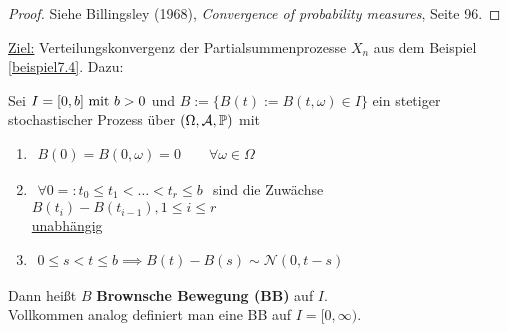 \begin{proof}
Siehe Billingsley (1968), \textit{Convergence of probability measures}, Seite 96.
\end{proof}

\ul{Ziel:} Verteilungskonvergenz der Partialsummenprozesse $X_n$ aus dem Beispiel \ref{beispiel7.4}. Dazu:

\begin{definition}\label{def7.12} %
Sei $I=[0,b]\mit b>0$ und $B:=\big\lbrace B(t):=B(t,\omega)\in I\big\rbrace$ ein stetiger stochastischer Prozess über $(\Omega,\A,\P)$ mit 
\begin{enumerate}[label=(\arabic*)]
\item $\begin{aligned}
B(0)=B(0,\omega)=0\qquad\forall\omega\in\Omega
\end{aligned}$
\item $\begin{aligned}
\forall 0=:t_0\leq t_1<\ldots<t_r\leq b
\end{aligned}$ sind die Zuwächse $B(t_i)-B(t_{i-1}),1\leq i\leq r$\\ \ul{unabhängig}
\item $\begin{aligned}
0\leq s<t\leq b\implies B(t)-B(s)\sim\mathcal{N}(0,t-s)
\end{aligned}$
\end{enumerate}
Dann heißt $B$ \textbf{Brownsche Bewegung (BB)} auf $I$.\\
Vollkommen analog definiert man eine BB auf $I=[0,\infty)$.
\end{definition}


